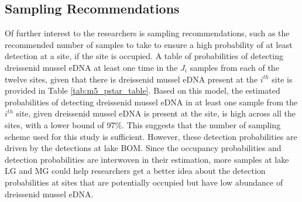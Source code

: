 \documentclass[12pt]{article}\usepackage[]{graphicx}\usepackage[]{color}
\begin{document}
\subsection{Sampling Recommendations}

Of further interest to the researchers is sampling recommendations, such as the recommended number of samples to take to ensure a high probability of at least detection at a site, if the site is occupied. A table of probabilities of detecting dreissenid mussel eDNA at least one time in the $J_i$ samples from each of the twelve sites, given that there is dreissenid mussel eDNA present at the $i^{th}$ site is provided in Table \ref{tab:m5_pstar_table}. Based on this model, the estimated probabilities of detecting dreissenid mussel eDNA in at least one sample from the $i^{th}$ site, given dreissenid mussel eDNA is present at the site, is high across all the sites, with a lower bound of 97\%. This suggests that the number of sampling scheme used for this study is sufficient. However, these detection probabilities are driven by the detections at lake BOM. Since the occupancy probabilities and detection probabilities are interwoven in their estimation, more samples at lake LG and MG could help researchers get a better idea about the detection probabilities at sites that are potentially occupied but have low abundance of dreissenid mussel eDNA. 
 
\end{document}
